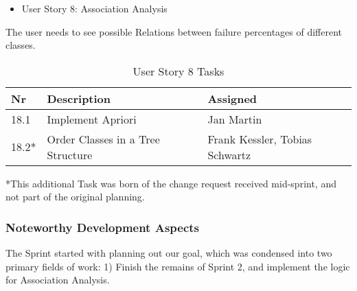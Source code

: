 \newpage
\begin{itemize}
	\item User Story 8: Association Analysis
	\end{itemize}
The user needs to see possible Relations between failure percentages of different classes.
\begin{table}[h]
  \caption{User Story 8 Tasks}
  \label{Story 8 Tasks}
  \centering
  \begin{tabular}{p{1cm}|p{5cm}|p{3cm}|}
  	Nr & Description & Assigned \\ 
  	\hline
  	18.1 & Implement Apriori & Jan Martin \\ 
  	\hline
  	18.2* & Order Classes in a Tree Structure & Frank Kessler, Tobias Schwartz \\ 
  	\hline
  \end{tabular}
\end{table}
*This additional Task was born of the change request received mid-sprint, and not part of the original planning.




\subsubsection*{Noteworthy Development Aspects}

The Sprint started with planning out our goal, which was condensed into two primary fields of work: 1) Finish the remains of Sprint 2, and implement the logic for Association Analysis. 

